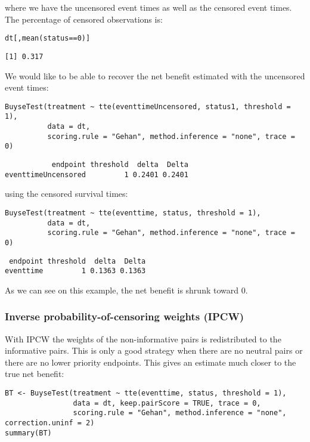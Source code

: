 \documentclass[12pt]{article}
\begin{document}
where we have the uncensored event times as well as the censored event
times. The percentage of censored observations is:
\lstset{language=r,label= ,caption= ,captionpos=b,numbers=none}
\begin{lstlisting}
dt[,mean(status==0)]
\end{lstlisting}

\begin{verbatim}
[1] 0.317
\end{verbatim}

We would like to be able to recover the net benefit estimated with the uncensored event times:
\lstset{language=r,label= ,caption= ,captionpos=b,numbers=none}
\begin{lstlisting}
BuyseTest(treatment ~ tte(eventtimeUncensored, status1, threshold = 1),
		  data = dt,
		  scoring.rule = "Gehan", method.inference = "none", trace = 0)
\end{lstlisting}

\begin{verbatim}
           endpoint threshold  delta  Delta
eventtimeUncensored         1 0.2401 0.2401
\end{verbatim}

using the censored survival times:
\lstset{language=r,label= ,caption= ,captionpos=b,numbers=none}
\begin{lstlisting}
BuyseTest(treatment ~ tte(eventtime, status, threshold = 1),
		  data = dt,
		  scoring.rule = "Gehan", method.inference = "none", trace = 0)
\end{lstlisting}

\begin{verbatim}
 endpoint threshold  delta  Delta
eventtime         1 0.1363 0.1363
\end{verbatim}

As we can see on this example, the net benefit is shrunk toward 0.

\subsubsection{Inverse probability-of-censoring weights (IPCW)}
\label{sec:orgf4988fd}

With IPCW the weights of the non-informative pairs is redistributed to
the informative pairs. This is only a good strategy when there are no
neutral pairs or there are no lower priority endpoints. This gives an
estimate much closer to the true net benefit:
\lstset{language=r,label= ,caption= ,captionpos=b,numbers=none}
\begin{lstlisting}
BT <- BuyseTest(treatment ~ tte(eventtime, status, threshold = 1),
				data = dt, keep.pairScore = TRUE, trace = 0,
				scoring.rule = "Gehan", method.inference = "none", correction.uninf = 2)
summary(BT)
\end{lstlisting}
\end{document}
